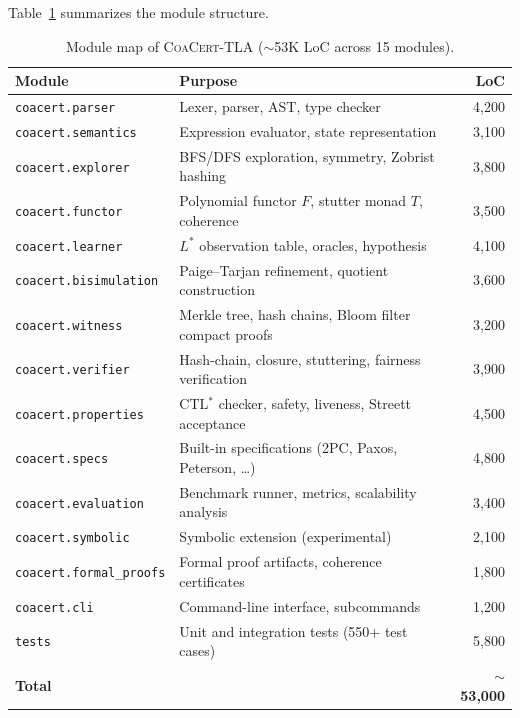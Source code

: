 \documentclass[11pt]{article}
\newcommand{\CoaCert}{\textsc{CoaCert-TLA}}
\begin{document}
Table~\ref{tab:modules} summarizes the module structure.

\begin{table}[t]
\centering
\caption{Module map of \CoaCert{} (${\sim}$53K LoC across 15 modules).}
\label{tab:modules}
\small
\begin{tabular}{@{}llr@{}}
\toprule
\textbf{Module} & \textbf{Purpose} & \textbf{LoC} \\
\midrule
\texttt{coacert.parser}      & Lexer, parser, AST, type checker & 4{,}200 \\
\texttt{coacert.semantics}   & Expression evaluator, state representation & 3{,}100 \\
\texttt{coacert.explorer}    & BFS/DFS exploration, symmetry, Zobrist hashing & 3{,}800 \\
\texttt{coacert.functor}     & Polynomial functor $F$, stutter monad $T$, coherence & 3{,}500 \\
\texttt{coacert.learner}     & $L^*$ observation table, oracles, hypothesis & 4{,}100 \\
\texttt{coacert.bisimulation}& Paige--Tarjan refinement, quotient construction & 3{,}600 \\
\texttt{coacert.witness}     & Merkle tree, hash chains, Bloom filter compact proofs & 3{,}200 \\
\texttt{coacert.verifier}    & Hash-chain, closure, stuttering, fairness verification & 3{,}900 \\
\texttt{coacert.properties}  & CTL$^*$ checker, safety, liveness, Streett acceptance & 4{,}500 \\
\texttt{coacert.specs}       & Built-in specifications (2PC, Paxos, Peterson, \ldots) & 4{,}800 \\
\texttt{coacert.evaluation}  & Benchmark runner, metrics, scalability analysis & 3{,}400 \\
\texttt{coacert.symbolic}    & Symbolic extension (experimental) & 2{,}100 \\
\texttt{coacert.formal\_proofs} & Formal proof artifacts, coherence certificates & 1{,}800 \\
\texttt{coacert.cli}         & Command-line interface, subcommands & 1{,}200 \\
\texttt{tests}               & Unit and integration tests (550+ test cases) & 5{,}800 \\
\midrule
\textbf{Total}               & & ${\sim}$\textbf{53{,}000} \\
\bottomrule
\end{tabular}
\end{table}
\end{document}
